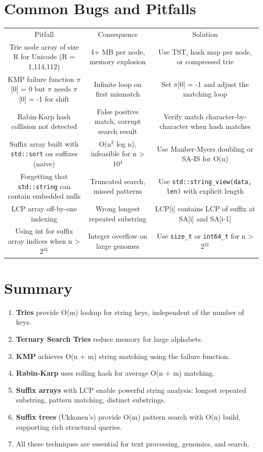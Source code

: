 \section{Common Bugs and Pitfalls}

\begin{center}
\begin{tabular}{ccc}
\toprule
Pitfall & Consequence & Solution \\
Trie node array of size R for Unicode (R = 1,114,112) & 4+ MB per node, memory explosion & Use TST, hash map per node, or compressed trie \\
KMP failure function $\pi $[0] = 0 but $\pi $ needs $\pi $[0] = -1 for shift & Infinite loop on first mismatch & Set $\pi $[0] = -1 and adjust the matching loop \\
Rabin-Karp hash collision not detected & False positive match, corrupt search result & Verify match character-by-character when hash matches \\
Suffix array built with \texttt{std::sort} on suffixes (naive) & O(n$^{2}$ log n), infeasible for n > 10$^{4}$ & Use Manber-Myers doubling or SA-IS for O(n) \\
Forgetting that \texttt{std::string} can contain embedded nulls & Truncated search, missed patterns & Use \texttt{std::string\_view(data, len)} with explicit length \\
LCP array off-by-one indexing & Wrong longest repeated substring & LCP[i] contains LCP of suffix at SA[i] and SA[i-1] \\
Using int for suffix array indices when n > 2$^{31}$ & Integer overflow on large genomes & Use \texttt{size\_t} or \texttt{int64\_t} for n > 2$^{31}$ \\

\bottomrule
\end{tabular}
\end{center}
\section{Summary}

\begin{enumerate}
\item \textbf{Tries} provide O(m) lookup for string keys, independent of the number of keys.
\item \textbf{Ternary Search Tries} reduce memory for large alphabets.
\item \textbf{KMP} achieves O(n + m) string matching using the failure function.
\item \textbf{Rabin-Karp} uses rolling hash for average O(n + m) matching.
\item \textbf{Suffix arrays} with LCP enable powerful string analysis: longest repeated substring, pattern matching, distinct substrings.
\item \textbf{Suffix trees} (Ukkonen's) provide O(m) pattern search with O(n) build, supporting rich structural queries.
\item All these techniques are essential for text processing, genomics, and search.
\end{enumerate}

